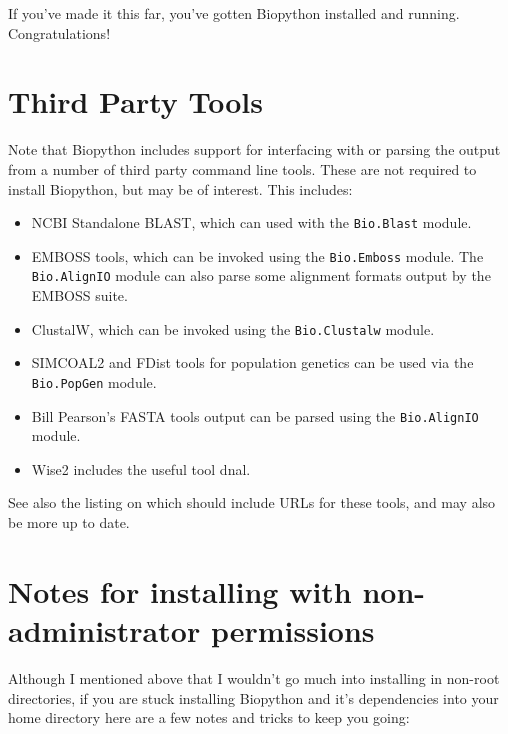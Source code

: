 \documentclass{article}
\begin{document}
If you've made it this far, you've gotten Biopython installed and running.
Congratulations!

\section{Third Party Tools}

Note that Biopython includes support for interfacing with or parsing the output from a number of third party command line tools.  These are not required to install Biopython, but may be of interest.  This includes:

\begin{itemize}
\item NCBI Standalone BLAST, which can used with the \verb|Bio.Blast| module.
\item EMBOSS tools, which can be invoked using the \verb|Bio.Emboss| module.  The \verb|Bio.AlignIO| module can also parse some alignment formats output by the EMBOSS suite.
\item ClustalW, which can be invoked using the \verb|Bio.Clustalw| module.
\item SIMCOAL2 and FDist tools for population genetics can be used via the \verb|Bio.PopGen| module.
\item Bill Pearson's FASTA tools output can be parsed using the \verb|Bio.AlignIO| module.
\item Wise2 includes the useful tool dnal.
\end{itemize}

\noindent
See also the listing on  which should include URLs for these tools, and may also be more up to date.

\section{Notes for installing with non-administrator permissions}

Although I mentioned above that I wouldn't go much into installing in
non-root directories, if you are stuck installing
Biopython and it's dependencies into your home directory here are a
few notes and tricks to keep you going:
\end{document}
